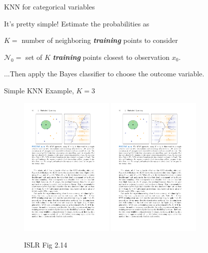 \documentclass[aspectratio=169]{beamer}
\begin{document}
\begin{frame}{KNN for categorical variables}

It's pretty simple!  Estimate the probabilities as



$K =$ number of neighboring \textbf{\textit{training}} points to consider

 $\mathcal{N}_0 = $ set of $K$ \textbf{\textit{training}} points closest to observation $x_0$.
 
 \vspace{5mm}
 
...Then apply the Bayes classifier to choose the outcome variable.

 
\end{frame}

\begin{frame}{Simple KNN Example, $K = 3$}

\begin{figure}
\includegraphics[width=0.4\textwidth]{KNN_example_1}
\pause \includegraphics[width=0.4\textwidth]{KNN_example_2}
\caption*{ISLR Fig 2.14}
\end{figure}
\end{frame}
\end{document}
